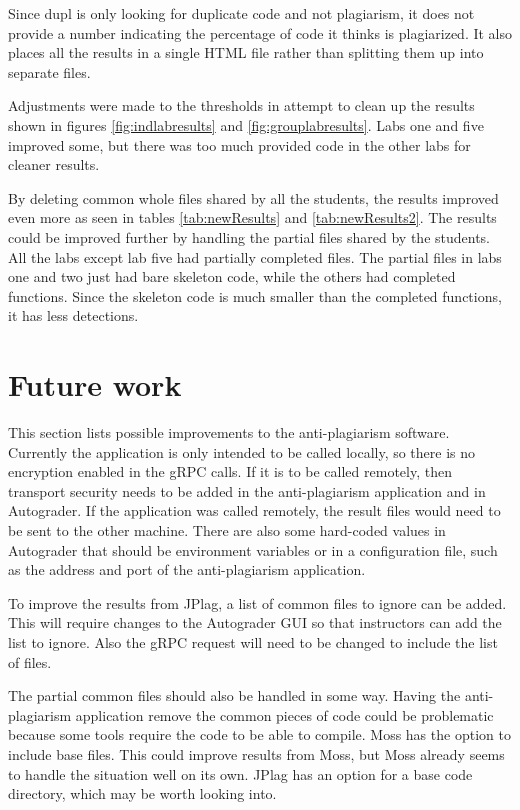 \documentclass[10pt,journal,compsoc]{IEEEtran}
\begin{document}
	Since dupl is only looking for duplicate code and not plagiarism, it does not provide a number indicating the percentage of code it thinks is plagiarized. It also places all the results in a single HTML file rather than splitting them up into separate files.
	
	Adjustments were made to the thresholds in attempt to clean up the results shown in figures \ref{fig:indlabresults} and \ref{fig:grouplabresults}. Labs one and five improved some, but there was too much provided code in the other labs for cleaner results.
	
	By deleting common whole files shared by all the students, the results improved even more as seen in tables \ref{tab:newResults} and \ref{tab:newResults2}. The results could be improved further by handling the partial files shared by the students. All the labs except lab five had partially completed files. The partial files in labs one and two just had bare skeleton code, while the others had completed functions. Since the skeleton code is much smaller than the completed functions, it has less detections.
	
	\section{Future work}
	This section lists possible improvements to the anti-plagiarism software. Currently the application is only intended to be called locally, so there is no encryption enabled in the gRPC calls. If it is to be called remotely, then transport security needs to be added in the anti-plagiarism application and in Autograder. If the application was called remotely, the result files would need to be sent to the other machine. There are also some hard-coded values in Autograder that should be environment variables or in a configuration file, such as the address and port of the anti-plagiarism application.
	
	To improve the results from JPlag, a list of common files to ignore can be added. This will require changes to the Autograder GUI so that instructors can add the list to ignore. Also the gRPC request will need to be changed to include the list of files.
	
	The partial common files should also be handled in some way. Having the anti-plagiarism application remove the common pieces of code could be problematic because some tools require the code to be able to compile. Moss has the option to include base files. This could improve results from Moss, but Moss already seems to handle the situation well on its own. JPlag has an option for a base code directory, which may be worth looking into.
	
\end{document}
